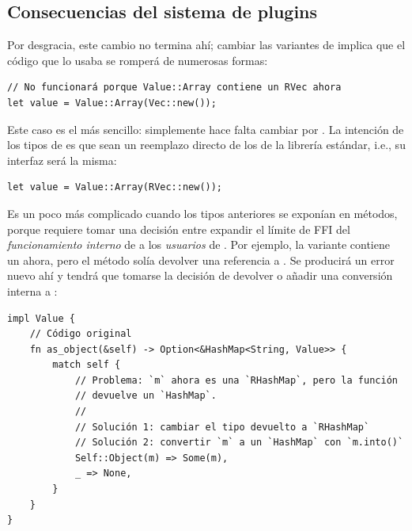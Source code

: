\subsection{Consecuencias del sistema de plugins}

Por desgracia, este cambio no termina ahí; cambiar las variantes de 
implica que el código que lo usaba se romperá de numerosas formas:

\begin{verbatim}
// No funcionará porque Value::Array contiene un RVec ahora
let value = Value::Array(Vec::new());
\end{verbatim}

Este caso es el más sencillo: simplemente hace falta cambiar  por
. La intención de los tipos de \abistable es que sean un reemplazo
directo de los de la librería estándar, i.e., su interfaz será la misma:

\begin{verbatim}
let value = Value::Array(RVec::new());
\end{verbatim}

Es un poco más complicado cuando los tipos anteriores se exponían en métodos,
porque requiere tomar una decisión entre expandir el límite de FFI del
\emph{funcionamiento interno} de  a los \emph{usuarios} de
. Por ejemplo, la variante  contiene un
 ahora, pero el método  solía devolver una
referencia a . Se producirá un error nuevo ahí y tendrá que
tomarse la decisión de devolver  o añadir una conversión interna
a :

\begin{verbatim}
impl Value {
    // Código original
    fn as_object(&self) -> Option<&HashMap<String, Value>> {
        match self {
            // Problema: `m` ahora es una `RHashMap`, pero la función
            // devuelve un `HashMap`.
            //
            // Solución 1: cambiar el tipo devuelto a `RHashMap`
            // Solución 2: convertir `m` a un `HashMap` con `m.into()`
            Self::Object(m) => Some(m),
            _ => None,
        }
    }
}
\end{verbatim}

